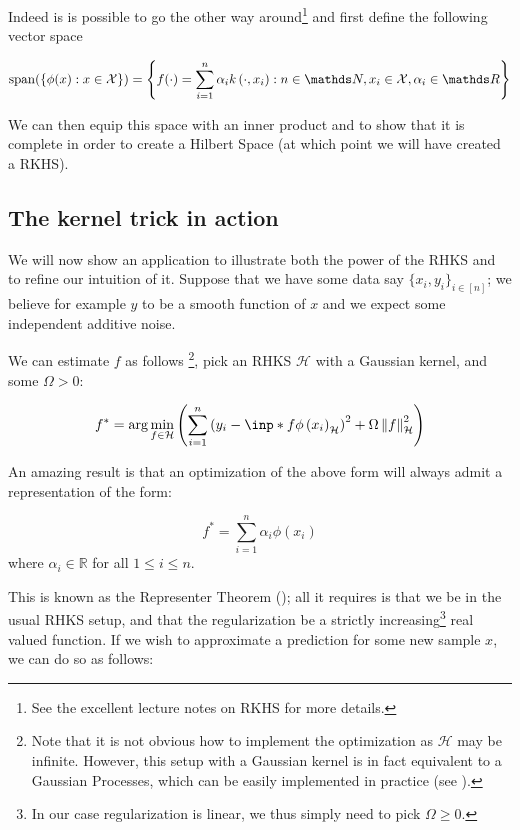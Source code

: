 Indeed is is possible to go the other way around\footnote{See the excellent lecture notes on 
RKHS \cite{BartlettNotes} for more details.} and first define the following vector space

\begin{equation}
    \operatorname{span}(\{\phi(x): x \in \mathcal{X}\})=\left\{f(\cdot)=
    \sum_{i=1}^{n} \alpha_{i} k\left(\cdot, x_{i}\right): n \in \N, x_{i} 
    \in \mathcal{X}, \alpha_{i} \in \R\right\}
\end{equation}

We can then equip this space with an inner product and to show that it is complete in order to create
a Hilbert Space (at which point we will have created a RKHS). 

\subsection{The kernel trick in action}

We will now show an application to illustrate both the power of the RHKS and to refine our intuition of it. 
Suppose that we have 
some data say $\{ x_i, y_i\}_{i \in [n]}$; we believe for example $y$ to be a smooth function of $x$ and we 
expect some independent additive noise.

We can estimate $f$ as follows
\footnote{Note that it is not obvious how to implement the optimization as $\mathcal{H}$ may be infinite. However,
this setup with a Gaussian kernel is in fact equivalent to a Gaussian Processes, which can be easily
implemented in practice (see \cite{JordanNotes}).}, pick an RHKS $\mathcal{H}$ with a Gaussian kernel, and some 
$\Omega > 0$:

\begin{equation}
    f^{*}=\arg \min _{f \in \mathcal{H}}\left(
        \sum_{i=1}^{n} 
        \left(y_{i} - \inp*{f}{\phi\left(x_{i}\right)}_{\mathcal{H}} \right)^{2}
        + \Omega \norm{f}_{\mathcal{H}}^{2}\right)
\end{equation}

An amazing result is that an optimization of the above form will always admit a representation of the
form:

\[
    f^{*} = \sum_{i=1}^{n} \alpha_{i} \phi\left(x_{i}\right)
\]
where $\alpha_{i} \in \mathbb{R}$ for all $1 \leq i \leq n$.

This is known as the Representer Theorem (\cite{scholkopf2001generalized}); all it requires is 
that we be in the usual RHKS setup, and that
the regularization be a strictly increasing\footnote{In our case regularization is linear,
we thus simply need to pick $\Omega \geq 0$.} real valued function.
If we wish to approximate a prediction for some new sample $x$, we can do so as follows:


